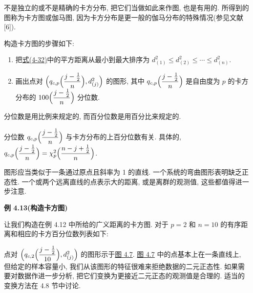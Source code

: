 不是独立的或不是精确的卡方分布, 把它们当做如此来作图, 也是有用的. 所得到的图称为卡方图或伽马图, 因为卡方分布是更一般的伽马分布的特殊情况(参见文献[6]).

构造卡方图的步骤如下:

\begin{enumerate}[label=\arabic*.,leftmargin=2em,itemsep=2pt]
\item 把\hyperref[eq:4-32]{式(4-32)}中的平方距离从最小到最大排序为 $d_{(1)}^{2}\le d_{(2)}^{2}\le\cdots\le d_{(n)}^{2}$.
\item 画出点对 $\Bigl(q_{c,p}\Bigl(\dfrac{j-\frac{1}{2}}{n}\Bigr),d_{(j)}^{2}\Bigr)$ 的图形, 其中 $q_{c,p}\Bigl(\dfrac{j-\frac{1}{2}}{n}\Bigr)$ 是自由度为 $p$ 的卡方分布的 $100\Bigl(\dfrac{j-\frac{1}{2}}{n}\Bigr)$ 分位数.
\end{enumerate}

分位数是用比例来规定的, 而百分位数是用百分比来规定的.

分位数 $q_{c,p}\Bigl(\dfrac{j-\frac{1}{2}}{n}\Bigr)$ 与卡方分布的上百分位数有关. 具体的, $q_{c,p}\Bigl(\dfrac{j-\frac{1}{2}}{n}\Bigr)=\chi_{p}^{2}\Bigl(\dfrac{n-j+\frac{1}{2}}{n}\Bigr)$.

图形应当类似于一条通过原点且斜率为 1 的直线. 一个系统的弯曲图形表明缺乏正态性. 一个或两个远离直线的点表示大的距离, 或是离群的观测值, 这些都值得进一步注意.

\noindent\textbf{例 4.13}\quad \textbf{(构造卡方图)}

让我们构造在例 4.12 中所给的广义距离的卡方图. 对于 $p=2$ 和 $n=10$ 的有序距离和相应的卡方百分位数列表如下:

\begin{mvtable}
\centering
{}
\end{mvtable}

点对 $\Bigl(q_{c,2}\Bigl(\dfrac{j-\frac{1}{2}}{10}\Bigr),d_{(j)}^{2}\Bigr)$ 的图形示于\hyperref[fig:4.7]{图 4.7}. \hyperref[fig:4.7]{图 4.7} 中的点基本上在一条直线上, 但给定的样本容量小, 我们从该图形的特征很难来拒绝数据的二元正态性. 如果需要对数据作进一步分析, 把它们变换为更接近二元正态的观测值是合理的. 适当的变换方法在 4.8 节中讨论.

